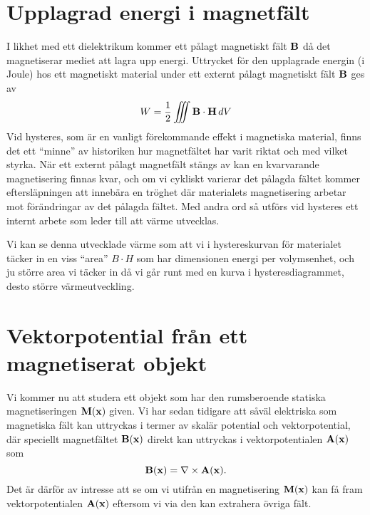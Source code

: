 \section{Upplagrad energi i magnetf{\"a}lt}
I likhet med ett dielektrikum kommer ett p{\aa}lagt magnetiskt f{\"a}lt
${\bf B}$ d{\aa} det magnetiserar mediet att lagra upp energi. Uttrycket
f{\"o}r den upplagrade energin (i Joule) hos ett magnetiskt material under
ett externt p{\aa}lagt magnetiskt f{\"a}lt ${\bf B}$ ges av
$$
  W = {{1}\over{2}}\iiint{\bf B}\cdot{\bf H}\,dV
$$
Vid hysteres, som {\"a}r en vanligt
f{\"o}rekommande effekt i magnetiska material, finns det ett ``minne'' av
historiken hur magnetf{\"a}ltet har varit riktat och med vilket styrka.
N{\"a}r ett externt p{\aa}lagt magnetf{\"a}lt st{\"a}ngs av kan en kvarvarande
magnetisering finnas kvar, och om vi cykliskt varierar det p{\aa}lagda
f{\"a}ltet kommer eftersl{\"a}pningen att inneb{\"a}ra en tr{\"o}ghet d{\"a}r
materialets magnetisering arbetar mot f{\"o}r{\"a}ndringar av det p{\aa}lagda
f{\"a}ltet. Med andra ord s{\aa} utf{\"o}rs vid hysteres ett internt arbete som
leder till att v{\"a}rme utvecklas.
\medskip
\centerline{}
\medskip
\noindent
Vi kan se denna utvecklade v{\"a}rme som att vi i hystereskurvan f{\"o}r
materialet t{\"a}cker in en viss ``area'' $B\cdot H$ som har dimensionen
energi per volymsenhet, och ju st{\"o}rre area vi t{\"a}cker in d{\aa} vi
g{\aa}r runt med en kurva i hysteresdiagrammet, desto st{\"o}rre
v{\"a}rmeutveckling.

\section{Vektorpotential fr{\aa}n ett magnetiserat objekt}
Vi kommer nu att studera ett objekt som har den rumsberoende statiska
magnetiseringen ${\bf M}({\bf x})$ given. Vi har sedan tidigare att
s{\aa}v{\"a}l elektriska som magnetiska f{\"a}lt kan uttryckas i termer av
skal{\"a}r potential och vektorpotential, d{\"a}r speciellt magnetf{\"a}ltet
${\bf B}({\bf x})$ direkt kan uttryckas i
vektorpotentialen
${\bf A}({\bf x})$ som
$$
  {\bf B}({\bf x})=\nabla\times{\bf A}({\bf x}).
$$
Det {\"a}r d{\"a}rf{\"o}r av intresse att se om vi utifr{\aa}n en magnetisering
${\bf M}({\bf x})$ kan f{\aa} fram vektorpotentialen ${\bf A}({\bf x})$ eftersom
vi via den kan extrahera {\"o}vriga f{\"a}lt.

